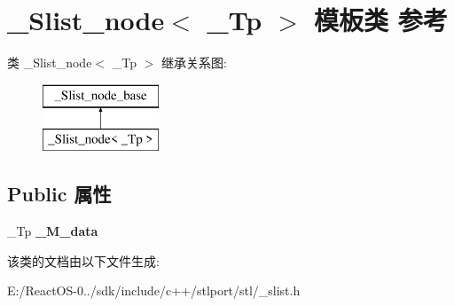 \hypertarget{class___slist__node}{}\section{\+\_\+\+Slist\+\_\+node$<$ \+\_\+\+Tp $>$ 模板类 参考}
\label{class___slist__node}
类 \+\_\+\+Slist\+\_\+node$<$ \+\_\+\+Tp $>$ 继承关系图\+:\begin{figure}[H]
\begin{center}
\leavevmode
\includegraphics[height=2.000000cm]{class___slist__node}
\end{center}
\end{figure}
\subsection*{Public 属性}
\begin{DoxyCompactItemize}
\item 
\mbox{\label{class___slist__node_a6c1819795e53df057fbfe2f30b0aeace}} 
\+\_\+\+Tp {\bfseries \+\_\+\+M\+\_\+data}
\end{DoxyCompactItemize}


该类的文档由以下文件生成\+:\begin{DoxyCompactItemize}
\item 
E\+:/\+React\+O\+S-\/0../sdk/include/c++/stlport/stl/\+\_\+slist.\+h\end{DoxyCompactItemize}
